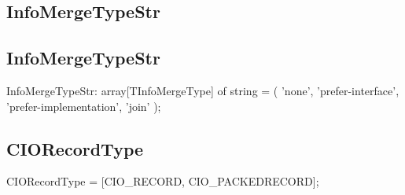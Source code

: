 \documentclass{report}
\newif\ifpdf
\begin{document}
\subsection*{\large{\textbf{InfoMergeTypeStr}}\normalsize\hspace{1ex}\hrulefill}
\else
\subsection*{InfoMergeTypeStr}
\fi
\label{PasDoc_Items-InfoMergeTypeStr}
\begin{list}{}{
\setlength{\itemindent}{0cm}
\setlength{\listparindent}{0cm}
\setlength{\leftmargin}{\evensidemargin}
\addtolength{\leftmargin}{\tmplength}
\settowidth{\labelsep}{X}
\addtolength{\leftmargin}{\labelsep}
\setlength{\labelwidth}{\tmplength}
}
\item[\textbf{Declaration}\hfill]
\ifpdf
\begin{flushleft}
\fi
\begin{ttfamily}
InfoMergeTypeStr: array[TInfoMergeType] of string = (
    'none',
    'prefer-interface',
    'prefer-implementation',
    'join'
  );\end{ttfamily}

\ifpdf
\end{flushleft}
\fi

\end{list}
\ifpdf
\subsection*{\large{\textbf{CIORecordType}}\normalsize\hspace{1ex}\hrulefill}
\else
\subsection*{CIORecordType}
\fi
\label{PasDoc_Items-CIORecordType}
\begin{list}{}{
\setlength{\itemindent}{0cm}
\setlength{\listparindent}{0cm}
\setlength{\leftmargin}{\evensidemargin}
\addtolength{\leftmargin}{\tmplength}
\settowidth{\labelsep}{X}
\addtolength{\leftmargin}{\labelsep}
\setlength{\labelwidth}{\tmplength}
}
\item[\textbf{Declaration}\hfill]
\ifpdf
\begin{flushleft}
\fi
\begin{ttfamily}
CIORecordType = [CIO{\_}RECORD, CIO{\_}PACKEDRECORD];\end{ttfamily}

\ifpdf
\end{flushleft}
\fi

\end{list}
\ifpdf
\end{document}
